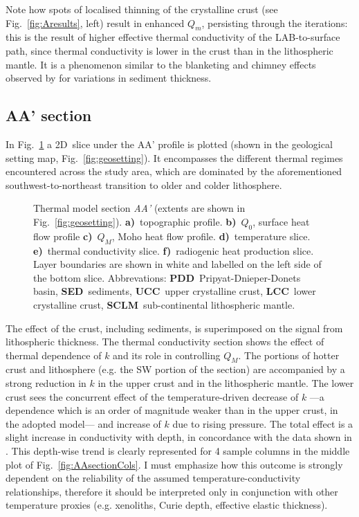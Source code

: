 Note how spots of localised thinning of the crystalline crust (see Fig.~\ref{fig:Aresults}, left) result in enhanced $Q_m$, persisting through the iterations: this is the result of higher effective thermal conductivity of the LAB-to-surface path, since thermal conductivity is lower in the crust than in the lithospheric mantle.
It is a phenomenon similar to the blanketing and chimney effects observed by \textcite{Przybycin2015} for variations in sediment thickness.

\subsection{AA' section}
\label{ss:Appl:DiscTherm:Section}

In Fig.~\ref{fig:AAsection} a 2D~slice under the AA' profile is plotted (shown in the geological setting map, Fig.~\ref{fig:geosetting}).
It encompasses the different thermal regimes encountered across the study area, which are dominated by the aforementioned southwest-to-northeast transition to older and colder lithosphere.

\begin{figure}
	\begin{adjustbox}{center}
	\end{adjustbox}
	\caption[Thermal model section AA'.]{Thermal model section \textit{AA'} (extents are shown in Fig.~\ref{fig:geosetting}).
	\textbf{a)}~topographic profile.
	\textbf{b)}~$Q_0$, surface heat flow profile
	\textbf{c)}~$Q_M$, Moho heat flow profile.
	\textbf{d)}~temperature slice.
	\textbf{e)}~thermal conductivity slice.
	\textbf{f)}~radiogenic heat production slice.
	Layer boundaries are shown in white and labelled on the left side of the bottom slice.
	Abbrevations: \textbf{PDD}~Pripyat-Dnieper-Donets basin, \textbf{SED}~sediments, \textbf{UCC}~upper crystalline crust, \textbf{LCC}~lower crystalline crust, \textbf{SCLM}~sub-continental lithospheric mantle.}
	\label{fig:AAsection}
\end{figure}

The effect of the crust, including sediments, is superimposed on the signal from lithospheric thickness.
The thermal conductivity section shows the effect of thermal dependence of $k$ and its role in controlling $Q_M$.
The portions of hotter crust and lithosphere (e.g. the SW portion of the section) are accompanied by a strong reduction in $k$ in the upper crust and in the lithospheric mantle.
The lower crust sees the concurrent effect of the temperature-driven decrease of $k$ ---a dependence which is an order of magnitude weaker than in the upper crust, in the adopted \textcite{Chapman1986} model--- and increase of $k$ due to rising pressure.
The total effect is a slight increase in conductivity with depth, in concordance with the data shown in \textcite{Chapman1986}.
This depth-wise trend is clearly represented for 4 sample columns in the middle plot of Fig.~\ref{fig:AAsectionCols}.
I must emphasize how this outcome is strongly dependent on the reliability of the assumed temperature-conductivity relationships, therefore it should be interpreted only in conjunction with other temperature proxies (e.g. xenoliths, Curie depth, effective elastic thickness).

